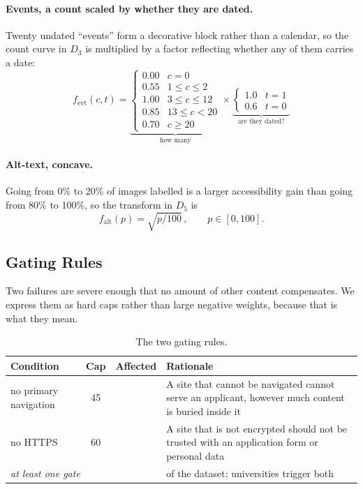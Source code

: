 \documentclass[11pt,a4paper]{article}
\begin{document}
\paragraph{Events, a count scaled by whether they are dated.} Twenty undated ``events'' form a
decorative block rather than a calendar, so the count curve in $D_3$ is multiplied by a factor
reflecting whether any of them carries a date:
\begin{equation}
f_{\text{evt}}(c, t) = \underbrace{\begin{cases}
0.00 & c = 0\\ 0.55 & 1 \le c \le 2\\ 1.00 & 3 \le c \le 12\\
0.85 & 13 \le c < 20\\ 0.70 & c \ge 20
\end{cases}}_{\text{how many}} \times \underbrace{\begin{cases} 1.0 & t = 1\\ 0.6 & t = 0
\end{cases}}_{\text{are they dated?}}
\label{eq:evt}
\end{equation}

\paragraph{Alt-text, concave.} Going from 0\% to 20\% of images labelled is a larger accessibility
gain than going from 80\% to 100\%, so the transform in $D_5$ is
\begin{equation}
f_{\text{alt}}(p) = \sqrt{p/100}\,, \qquad p \in [0,100].
\label{eq:alt}
\end{equation}

\subsection{Gating Rules}
\label{sec:gates}

Two failures are severe enough that no amount of other content compensates. We express them as hard
caps rather than large negative weights, because that is what they mean.

\begin{table}[H]\centering\small
\caption{The two gating rules.}
\begin{tabular}{lccp{6.9cm}}
\toprule
\textbf{Condition} & \textbf{Cap} & \textbf{Affected} & \textbf{Rationale} \\
\midrule
no primary navigation & 45 & \nGateNav{} & A site that cannot be navigated cannot serve an
applicant, however much content is buried inside it \\
no HTTPS              & 60 & \nGateHttps{}  & A site that is not encrypted should not be trusted
with an application form or personal data \\
\midrule
\multicolumn{2}{l}{\emph{at least one gate}} & \textbf{\nGated{}} & \pctGated{} of the dataset;
\nGateBoth{} universities trigger both \\
\bottomrule
\end{tabular}
\end{table}
\end{document}

